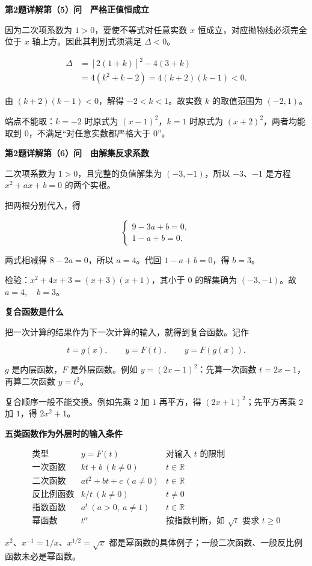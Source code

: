 \documentclass[UTF8,10pt,aspectratio=169]{ctexbeamer}
\newcommand{\PageHeading}[1]{\begin{center}{\Large\bfseries #1}\end{center}\vspace{0.12cm}}
\begin{document}
\begin{frame}[t]
\PageHeading{第2题详解\quad 第（5）问　严格正值恒成立}
因为二次项系数为 $1>0$，要使不等式对任意实数 $x$ 恒成立，对应抛物线必须完全位于 $x$ 轴上方。因此其判别式须满足 $\Delta<0$。
\par
\pause
\[\begin{aligned}\Delta&=[2(1+k)]^2-4(3+k)\\&=4(k^2+k-2)=4(k+2)(k-1)<0.\end{aligned}\]
\par
由 $(k+2)(k-1)<0$，解得 $-2<k<1$。故实数 $k$ 的取值范围为 $\boxed{(-2,1)}$。
\par
端点不能取：$k=-2$ 时原式为 $(x-1)^2$，$k=1$ 时原式为 $(x+2)^2$，两者均能取到 $0$，不满足“对任意实数都严格大于 $0$”。
\par
\end{frame}
\begin{frame}[t]
\PageHeading{第2题详解\quad 第（6）问　由解集反求系数}
二次项系数为 $1>0$，且完整的负值解集为 $(-3,-1)$，所以 $-3$、$-1$ 是方程 $x^2+ax+b=0$ 的两个实根。
\par
\pause
把两根分别代入，得
\par
\[\begin{cases}9-3a+b=0,\\1-a+b=0.\end{cases}\]
\par
两式相减得 $8-2a=0$，所以 $a=4$。代回 $1-a+b=0$，得 $b=3$。
\par
检验：$x^2+4x+3=(x+3)(x+1)$，其小于 $0$ 的解集确为 $(-3,-1)$。故 $\boxed{a=4,\quad b=3}$。
\par
\end{frame}
\begin{frame}[t]
\PageHeading{复合函数是什么}
把一次计算的结果作为下一次计算的输入，就得到复合函数。记作
\par
\pause
\[t=g(x),\qquad y=F(t),\qquad y=F(g(x)).\]
\par
$g$ 是内层函数，$F$ 是外层函数。例如 $y=(2x-1)^2$：先算一次函数 $t=2x-1$，再算二次函数 $y=t^2$。
\par
复合顺序一般不能交换。例如先乘 $2$ 加 $1$ 再平方，得 $(2x+1)^2$；先平方再乘 $2$ 加 $1$，得 $2x^2+1$。
\par
\end{frame}
\begin{frame}[t]
\PageHeading{五类函数作为外层时的输入条件}
\[\begin{array}{c|c|l}\text{类型}&y=F(t)&\text{对输入 }t\text{ 的限制}\\\hline\text{一次函数}&kt+b\ (k\ne0)&t\in\mathbb R\\\text{二次函数}&at^2+bt+c\ (a\ne0)&t\in\mathbb R\\\text{反比例函数}&k/t\ (k\ne0)&t\ne0\\\text{指数函数}&a^t\ (a>0,\ a\ne1)&t\in\mathbb R\\\text{幂函数}&t^\alpha&\text{按指数判断，如 }\sqrt t\text{ 要求 }t\ge0\end{array}\]
\par
\pause
$x^2$、$x^{-1}=1/x$、$x^{1/2}=\sqrt x$ 都是幂函数的具体例子；一般二次函数、一般反比例函数未必是幂函数。
\par
\end{frame}
\end{document}
